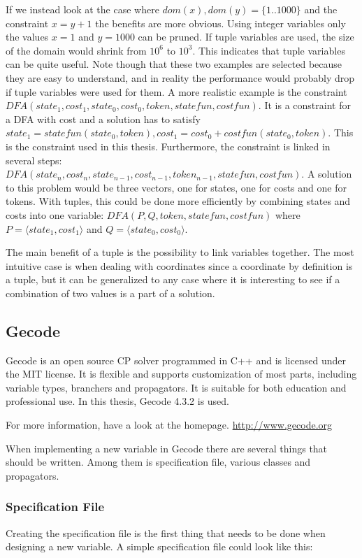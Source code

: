 \documentclass[a4paper,11pt]{article}
\begin{document}
If we instead look at the case where $dom(x),dom(y)=\{1..1000\}$ and the constraint $x=y+1$ the benefits are more obvious. Using integer variables only the values $x=1$ and $y=1000$ can be pruned. If tuple variables are used, the size of the domain would shrink from $10^6$ to $10^3$. This indicates that tuple variables can be quite useful. Note though that these two examples are selected because they are easy to understand, and in reality the performance would probably drop if tuple variables were used for them. A more realistic example is the constraint $DFA(state_1, cost_1, state_0, cost_0, token, statefun, costfun)$. It is a constraint for a DFA with cost and a solution has to satisfy $state_1= statefun(state_0, token), cost_1=cost_0+costfun(state_0, token)$. This is the constraint used in this thesis. Furthermore, the constraint is linked in several steps: $DFA(state_n, cost_n, state_{n-1}, cost_{n-1}, token_{n-1}, statefun, costfun)$. A solution to this problem would be three vectors, one for states, one for costs and one for tokens. With tuples, this could be done more efficiently by combining states and costs into one variable: $DFA(P, Q, token, statefun, costfun)$ where $P=\langle state_1, cost_1\rangle$ and $Q=\langle state_0, cost_0\rangle$.

The main benefit of a tuple is the possibility to link variables together. The most intuitive case is when dealing with coordinates since a coordinate by definition is a tuple, but it can be generalized to any case where it is interesting to see if a combination of two values is a part of a solution. 

\subsection{Gecode}
Gecode is an open source CP solver programmed in C++ and is licensed under the MIT license. It is flexible and supports customization of most parts, including variable types, branchers and propagators. It is suitable for both education and professional use. In this thesis, Gecode 4.3.2 is used.

For more information, have a look at the homepage. \url{http://www.gecode.org}

When implementing a new variable in Gecode there are several things that should be written. Among them is specification file, various classes and propagators.
\subsubsection{Specification File}
Creating the specification file is the first thing that needs to be done when designing a new variable.  A simple specification file could look like this:
\end{document}
